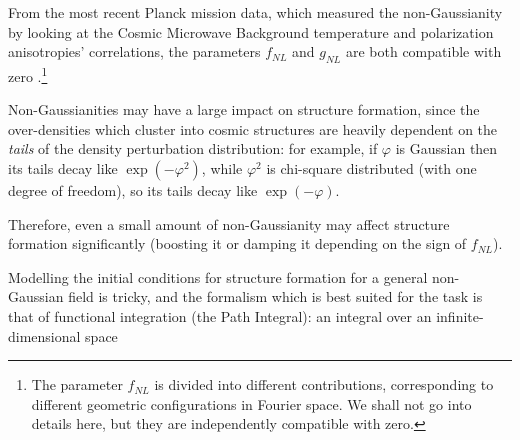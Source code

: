 \documentclass[main.tex]{subfiles}
\begin{document}
From the most recent Planck mission data, which measured the non-Gaussianity by looking at the Cosmic Microwave Background temperature and polarization anisotropies' correlations, the parameters \(f_{NL}\) and \(g_{NL}\) are both compatible with zero \cite[]{planckcollaborationPlanck2018Results2019}.\footnote{The parameter \(f_{{NL}}\) is divided into different contributions, corresponding to different geometric configurations in Fourier space. We shall not go into details here, but they are independently compatible with zero.}

Non-Gaussianities may have a large impact on structure formation, since the over-densities which cluster into cosmic structures are heavily dependent on the \emph{tails} of the density perturbation distribution: for example, if \(\varphi \) is Gaussian then its tails decay like \(\exp(- \varphi^2)\), while \(\varphi^2\) is chi-square distributed (with one degree of freedom), so its tails decay like \(\exp(- \varphi )\).

Therefore, even a small amount of non-Gaussianity may affect structure formation significantly (boosting it or damping it depending on the sign of \(f_{NL}\)).


Modelling the initial conditions for structure formation for a general non-Gaussian field is tricky, and the formalism which is best suited for the task is that of functional integration (the Path Integral): an integral over an infinite-dimensional space






\end{document}

